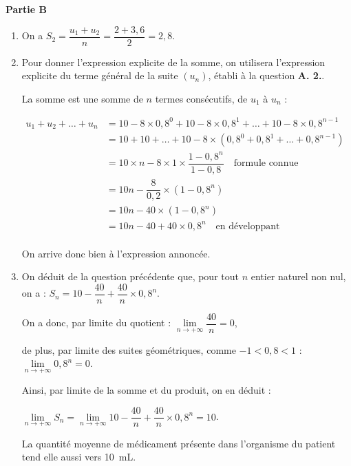 \documentclass[10pt]{article}
\providecommand{\np}[2][]{{#2~#1}}
\begin{document}
\medskip

\textbf{Partie B}

\medskip

\begin{enumerate}
	\item On a $S_2 = \dfrac{u_1 + u_2}{n} = \dfrac{2 + 3,6}{2} = 2,8$.

	\item Pour donner l'expression explicite de la somme, on utilisera l'expression explicite du terme général de la suite $(u_n)$, établi à la question \textbf{A. 2.}.

	La somme est une somme de $n$ termes consécutifs, de $u_1$ à $u_n$ :

$\begin{aligned}
		u_1 + u_2 + \dots + u_n
		&= 10 - 8\times 0,8^{0} + 10 - 8\times 0,8^{1} + \dots + 10 - 8\times 0,8^{n-1}\\
		&= 10 + 10 + \dots + 10 - 8\times \left( 0,8^{0} + 0,8^{1} + \dots + 0,8^{n-1}\right)\\
		&= 10\times n - 8 \times 1 \times \dfrac{1 - 0,8^{n}}{1 - 0,8}\quad \text{formule connue}\\
		&= 10 n - \dfrac{8}{0,2} \times \left(1 - 0,8^{n}\right)\\
		&= 10 n - 40 \times \left(1 - 0,8^{n}\right)\\
		&= 10 n - 40 + 40 \times 0,8^{n}\quad \text{en développant}\\
\end{aligned}$

On arrive donc bien à l'expression annoncée.

	\item On déduit de la question précédente que, pour tout $n$ entier naturel non nul, on a : \quad $ S_n = 10 - \dfrac{40}{n} + \dfrac{40}{n}\times 0,8^n $.

On a donc, par limite du quotient : \quad $\lim\limits_{n \to +\infty} \dfrac{40}{n} = 0$,

de plus, par limite des suites géométriques, comme $-1 < 0,8 < 1 $ :\quad $\lim\limits_{n \to +\infty} 0,8^n = 0$.

Ainsi, par limite de la somme et du produit, on en déduit :

$\lim\limits_{n \to +\infty} S_n = \lim\limits_{n \to +\infty} 10 - \dfrac{40}{n} + \dfrac{40}{n}\times 0,8^n  = 10$.

La quantité moyenne de médicament présente dans l'organisme du patient tend elle aussi vers \np[mL]{10}.


\end{enumerate}
\end{document}
